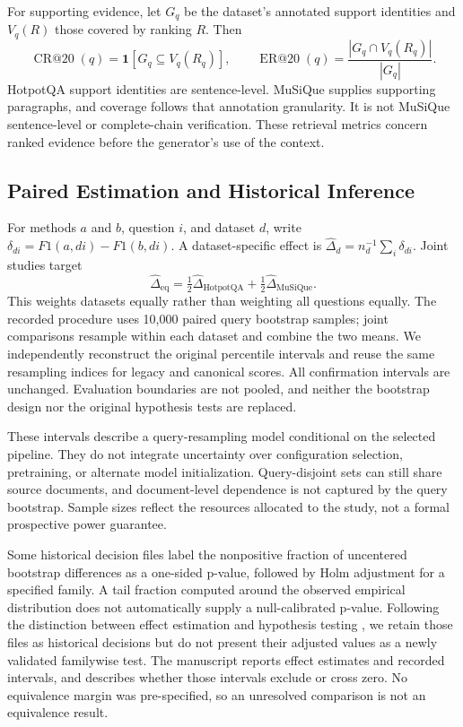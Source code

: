\documentclass[11pt,a4paper]{article}
\begin{document}
For supporting evidence, let $G_q$ be the dataset's annotated support
identities and $V_q(R)$ those covered by ranking $R$. Then
\begin{equation}
\operatorname{CR@20}(q)=\mathbf{1}[G_q\subseteq V_q(R_q)],\qquad
\operatorname{ER@20}(q)=\frac{|G_q\cap V_q(R_q)|}{|G_q|}.
\end{equation}
HotpotQA support identities are sentence-level. MuSiQue supplies supporting
paragraphs, and coverage follows that annotation granularity. It is not
MuSiQue sentence-level or complete-chain verification. These retrieval
metrics concern ranked evidence before the generator's use of the context.

\subsection{Paired Estimation and Historical Inference}
For methods $a$ and $b$, question $i$, and dataset $d$, write
$\delta_{di}=F1(a,di)-F1(b,di)$. A dataset-specific effect is
$\hat\Delta_d=n_d^{-1}\sum_i\delta_{di}$. Joint studies target
\begin{equation}
\hat\Delta_{\mathrm{eq}}=\tfrac12\hat\Delta_{\mathrm{HotpotQA}}
                       +\tfrac12\hat\Delta_{\mathrm{MuSiQue}}.
\end{equation}
This weights datasets equally rather than weighting all questions equally.
The recorded procedure uses 10,000 paired query bootstrap samples; joint
comparisons resample within each dataset and combine the two means. We
independently reconstruct the original percentile intervals and reuse the same
resampling indices for legacy and canonical scores. All confirmation
intervals are unchanged. Evaluation boundaries are not pooled, and neither
the bootstrap design nor the original hypothesis tests are replaced.

These intervals describe a query-resampling model conditional on the selected
pipeline. They do not integrate uncertainty over configuration selection,
pretraining, or alternate model initialization. Query-disjoint sets can still
share source documents, and document-level dependence is not captured by the
query bootstrap. Sample sizes reflect the resources allocated to the study,
not a formal prospective power guarantee.

Some historical decision files label the nonpositive fraction of uncentered
bootstrap differences as a one-sided p-value, followed by Holm adjustment for
a specified family. A tail fraction computed around the observed empirical
distribution does not automatically supply a null-calibrated p-value.
Following the distinction between effect estimation and hypothesis testing
\citep{dror2018hitchhiker}, we retain those files as historical decisions but
do not present their adjusted values as a newly validated familywise test.
The manuscript reports effect estimates and recorded intervals, and describes
whether those intervals exclude or cross zero. No equivalence margin was
pre-specified, so an unresolved comparison is not an equivalence result.
\end{document}
